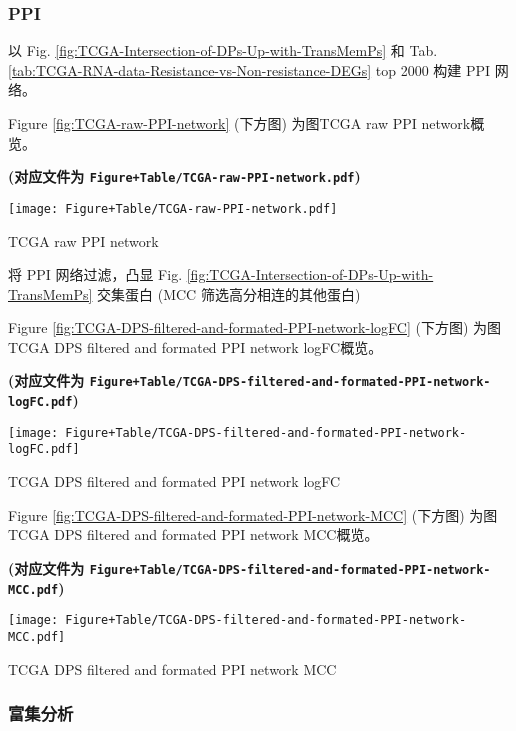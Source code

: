 \documentclass[
]{article}
\begin{document}
\hypertarget{ppi-1}{%
\subsubsection{PPI}\label{ppi-1}}

以 Fig. \ref{fig:TCGA-Intersection-of-DPs-Up-with-TransMemPs} 和 Tab. \ref{tab:TCGA-RNA-data-Resistance-vs-Non-resistance-DEGs} top 2000 构建 PPI 网络。

Figure \ref{fig:TCGA-raw-PPI-network} (下方图) 为图TCGA raw PPI network概览。

\textbf{(对应文件为 \texttt{Figure+Table/TCGA-raw-PPI-network.pdf})}

\def\@captype{figure}
\begin{center}
\texttt{[image: Figure+Table/TCGA-raw-PPI-network.pdf]}
\caption{TCGA raw PPI network}\label{fig:TCGA-raw-PPI-network}
\end{center}

将 PPI 网络过滤，凸显 Fig. \ref{fig:TCGA-Intersection-of-DPs-Up-with-TransMemPs} 交集蛋白 (MCC 筛选高分相连的其他蛋白)

Figure \ref{fig:TCGA-DPS-filtered-and-formated-PPI-network-logFC} (下方图) 为图TCGA DPS filtered and formated PPI network logFC概览。

\textbf{(对应文件为 \texttt{Figure+Table/TCGA-DPS-filtered-and-formated-PPI-network-logFC.pdf})}

\def\@captype{figure}
\begin{center}
\texttt{[image: Figure+Table/TCGA-DPS-filtered-and-formated-PPI-network-logFC.pdf]}
\caption{TCGA DPS filtered and formated PPI network logFC}\label{fig:TCGA-DPS-filtered-and-formated-PPI-network-logFC}
\end{center}

Figure \ref{fig:TCGA-DPS-filtered-and-formated-PPI-network-MCC} (下方图) 为图TCGA DPS filtered and formated PPI network MCC概览。

\textbf{(对应文件为 \texttt{Figure+Table/TCGA-DPS-filtered-and-formated-PPI-network-MCC.pdf})}

\def\@captype{figure}
\begin{center}
\texttt{[image: Figure+Table/TCGA-DPS-filtered-and-formated-PPI-network-MCC.pdf]}
\caption{TCGA DPS filtered and formated PPI network MCC}\label{fig:TCGA-DPS-filtered-and-formated-PPI-network-MCC}
\end{center}

\hypertarget{ux5bccux96c6ux5206ux6790-1}{%
\subsubsection{富集分析}\label{ux5bccux96c6ux5206ux6790-1}}
\end{document}
